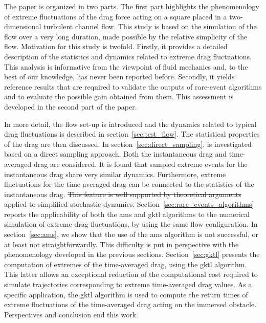 \documentclass{jfm}
\newcommand{\EL}[1]{{\color{myred}{#1}}}
\begin{document}
{The paper is organized in two parts. The first part highlights the phenomenology of extreme fluctuations of the drag force acting on a square placed in a two-dimensional turbulent channel flow. This study is based on the simulation of the flow over a very long duration, made possible by the relative simplicity of the flow.}
%
Motivation for this study is twofold.
Firstly, it provides a detailed description of the statistics and dynamics related to extreme drag fluctuations. This analysis is informative from the  viewpoint of fluid mechanics and, to the best of our knowledge, has never been reported before.
Secondly, it yields reference results that are required to validate the outputs of rare-event algorithms and to evaluate the possible gain obtained from them. This assessment is developed in the second part of the paper.

In more detail,  the flow set-up is introduced and the dynamics related to typical
drag fluctuations is described in section~\ref{sec:test_flow}.
The statistical properties of the drag are then discussed.
In section~\ref{sec:direct_sampling}, \EL{the phenomenology of  extreme
	drag fluctuations} is investigated based on a direct sampling approach.
Both the instantaneous drag and time-averaged drag are considered.
It is found that sampled extreme events for the instantaneous drag share very similar dynamics. Furthermore, extreme fluctuations for the time-averaged drag can be connected to the statistics of the instantaneous drag.
\sout{This feature is well supported by theoretical arguments applied to simplified stochastic dynamics.}
Section~\ref{sec:rare_events_algorithms} reports the applicability of both the \ac{ams} and \ac{gktl} algorithms to the numerical simulation of extreme drag fluctuations, by using the same flow configuration.
In section~\ref{sec:ams}, we show that the use of the \ac{ams} algorithm is not successful, or at least not straightforwardly. This difficulty is put in perspective with the phenomenology developed in the previous sections.
Section~\ref{sec:gktl} presents the computation of extremes of the time-averaged drag, using the \ac{gktl} algorithm.
This latter allows an exceptional reduction of the computational cost required to simulate trajectories corresponding to extreme time-averaged drag values.
As a specific \EL{successful} application, the \ac{gktl} algorithm is used to compute the return times of extreme fluctuations of the time-averaged drag acting on the immersed obstacle.
Perspectives and conclusion end this work.
\end{document}
